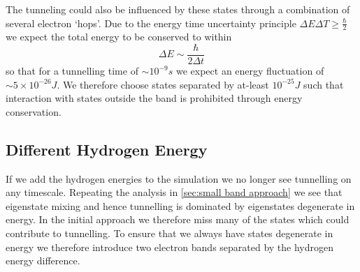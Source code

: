 The tunneling could also be
influenced by these states
through a combination of
several electron `hops'.
Due to the energy time uncertainty
principle \(\Delta{}E\Delta{}T \geq \frac{\hbar}{2}\)
we expect the total energy to be conserved
to within
\begin{equation}
    \Delta{}E \sim \frac{\hbar}{2\Delta{} t}
\end{equation}
so that for a tunnelling time of
\(\sim 10^{-9}s\)
we expect an energy fluctuation
of \(\sim 5\times{}10^{-26} J\).
We therefore choose states separated
by at-least \(10^{-25} J\) such that
interaction with states outside
the band is prohibited
through energy conservation.


\subsection{Different Hydrogen Energy}\label{sec:different hydrogen energy}
If we add the hydrogen energies to the
simulation we no longer see tunnelling
on any timescale. Repeating the analysis
in \cref{sec:small band approach} we
see that eigenstate mixing and hence
tunnelling is dominated by
eigenstates degenerate in energy.
In the initial approach we therefore
miss many of the states which could
contribute to tunnelling. To ensure that we always have
states degenerate in energy we
therefore introduce two electron
bands separated by the hydrogen energy
difference.
